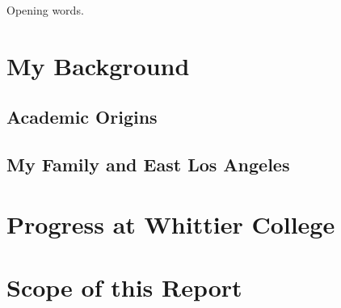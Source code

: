 \documentclass[../../main.tex]{subfiles}
\begin{document}
Opening words.

\section{My Background}

\subsection{Academic Origins}

\subsection{My Family and East Los Angeles}

\section{Progress at Whittier College}

\section{Scope of this Report}
\end{document}
